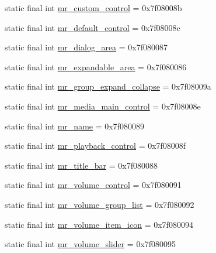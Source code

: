 \begin{CompactItemize}
static final int \hyperlink{classandroid_1_1support_1_1v7_1_1palette_1_1_r_1_1id_436f2892ec504a7ea5b2262e6c46d529}{mr\_\-custom\_\-control} = 0x7f08008b
\item 
static final int \hyperlink{classandroid_1_1support_1_1v7_1_1palette_1_1_r_1_1id_6abe02da696bf5f1d800a278d468dd88}{mr\_\-default\_\-control} = 0x7f08008c
\item 
static final int \hyperlink{classandroid_1_1support_1_1v7_1_1palette_1_1_r_1_1id_183068017642f7fb3d20227be3e7b042}{mr\_\-dialog\_\-area} = 0x7f080087
\item 
static final int \hyperlink{classandroid_1_1support_1_1v7_1_1palette_1_1_r_1_1id_13437d1a9fbe86880f57578c32257cf9}{mr\_\-expandable\_\-area} = 0x7f080086
\item 
static final int \hyperlink{classandroid_1_1support_1_1v7_1_1palette_1_1_r_1_1id_8f65aedf30324175b63c01cf346fc9e0}{mr\_\-group\_\-expand\_\-collapse} = 0x7f08009a
\item 
static final int \hyperlink{classandroid_1_1support_1_1v7_1_1palette_1_1_r_1_1id_d1395f76f7110e4db4aecbadc8e39608}{mr\_\-media\_\-main\_\-control} = 0x7f08008e
\item 
static final int \hyperlink{classandroid_1_1support_1_1v7_1_1palette_1_1_r_1_1id_956638cd231c0e4b0cb86d3990302cdd}{mr\_\-name} = 0x7f080089
\item 
static final int \hyperlink{classandroid_1_1support_1_1v7_1_1palette_1_1_r_1_1id_3fbf64c92d959c71827e140ae489d89f}{mr\_\-playback\_\-control} = 0x7f08008f
\item 
static final int \hyperlink{classandroid_1_1support_1_1v7_1_1palette_1_1_r_1_1id_07215c29312f02efc3b73c1bea7284ea}{mr\_\-title\_\-bar} = 0x7f080088
\item 
static final int \hyperlink{classandroid_1_1support_1_1v7_1_1palette_1_1_r_1_1id_abff68c9211c6de1bdfe90537d550e4d}{mr\_\-volume\_\-control} = 0x7f080091
\item 
static final int \hyperlink{classandroid_1_1support_1_1v7_1_1palette_1_1_r_1_1id_9bfca8ae0ba4ed8acfefb06008ae827b}{mr\_\-volume\_\-group\_\-list} = 0x7f080092
\item 
static final int \hyperlink{classandroid_1_1support_1_1v7_1_1palette_1_1_r_1_1id_0eaa9c12426491d3fd4db9545a2c8b24}{mr\_\-volume\_\-item\_\-icon} = 0x7f080094
\item 
static final int \hyperlink{classandroid_1_1support_1_1v7_1_1palette_1_1_r_1_1id_007671d444d4d79134ec3b85130265bf}{mr\_\-volume\_\-slider} = 0x7f080095
\item 

\end{CompactItemize}
